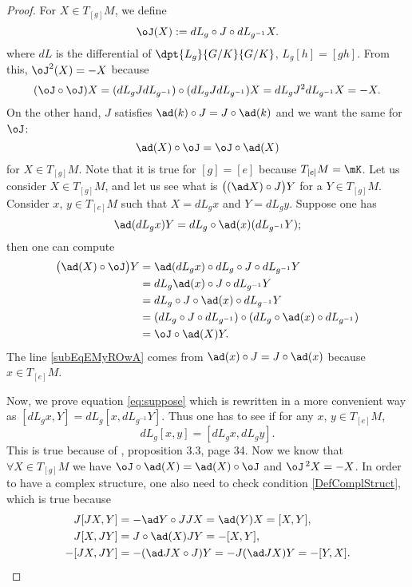 \begin{proof}
	For $X\in T_{[g]}M$, we define
	\begin{equation}
		\oJ(X):=dL_g\circ J\circ dL_{g^{-1}}X.
	\end{equation}
	where $dL$ is the differential of $\dpt{L_g}{G/K}{G/K}$, $L_g[h]=[gh]$.
	From this, $\oJ^2(X)=-X$ because
	\begin{equation}
		(\oJ\circ\oJ)X=( dL_g J dL_{g^{-1}} )\circ( dL_g J dL_{g^{-1}} )X
		=dL_g J^2dL_{g^{-1}}X
		=-X.
	\end{equation}
	On the other hand, $J$ satisfies $\ad(k)\circ J=J\circ \ad(k)$ and we want the same for $\oJ$:
	\[
		\ad(X)\circ\oJ=\oJ\circ\ad(X)
	\]
	for $X\in T_{[g]}M$. Note that it is true for $[g]=[e]$ because $T_{[e]}M=\mK$. Let us consider $X\in T_{[g]}M$, and let us see what is $ \big( (\ad X)\circ J \big)Y $ for a $Y\in T_{[g]}M$. Consider $x$, $y\in T_{[e]}M$ such that $X=dL_g x$ and $Y=dL_g y$. Suppose one has
	\begin{equation}\label{eq:suppose}
		\ad(dL_g x)Y=dL_g\circ\ad(x)(dL_{g^{-1}}Y);
	\end{equation}
	then one can compute
	\begin{subequations}
		\begin{align}
			\big(  \ad(X)\circ\oJ \big)Y & =\ad(dL_g x)\circ dL_g\circ J\circ dL_{g^{-1}}Y                         \\
			                             & =dL_g\ad(x) \circ J\circ dL_{g^{-1}}Y\label{subEqEMyROwA}               \\
			                             & =dL_g\circ J\circ\ad(x)\circ dL_{g^{-1}}Y                               \\
			                             & =(dL_g\circ J\circ dL_{g^{-1}})\circ (dL_g\circ\ad(x)\circ dL_{g^{-1}}) \\
			                             & =\oJ\circ\ad(X)Y.
		\end{align}
	\end{subequations}
	The line \eqref{subEqEMyROwA} comes from $\ad(x)\circ J=J\circ\ad(x)$ because $x\in T_{[e]}M$.

	Now, we prove equation \eqref{eq:suppose} which is rewritten in a more convenient way as $[dL_g x,Y]=dL_g[x,dL_{g^{-1}}Y]$. Thus one has to see if for any $x$, $y\in T_{[e]}M$,
	\[
		dL_g[x,y]=[dL_g x,dL_g y].
	\]
	This is true because of \cite{Helgason}, proposition 3.3, page 34.  Now we know that $\forall X\in T_{[g]}M$ we have $\oJ\circ\ad(X)=\ad(X)\circ\oJ$ and ${\oJ}\,^2X=-X$.  In order to have a complex structure, one also need to check condition \eqref{DefComplStruct}, which is true because
	\begin{equation}
		\begin{split}
			J[JX,Y]&=-\ad Y\circ JJX=\ad(Y)X=[X,Y],\\
			J[X,JY]&=J\circ\ad(X)JY=-[X,Y],\\
			-[JX,JY]&=-(\ad JX\circ J)Y
			=-J(\ad JX)Y
			=-[Y,X].
		\end{split}
	\end{equation}

\end{proof}

